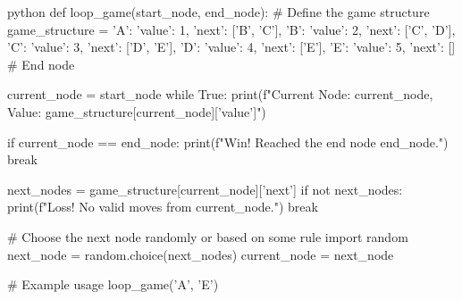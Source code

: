 python
def loop_game(start_node, end_node):
    # Define the game structure
    game_structure = {
        'A': {'value': 1, 'next': ['B', 'C']},
        'B': {'value': 2, 'next': ['C', 'D']},
        'C': {'value': 3, 'next': ['D', 'E']},
        'D': {'value': 4, 'next': ['E']},
        'E': {'value': 5, 'next': []}  # End node
    }
    
    current_node = start_node
    while True:
        print(f"Current Node: {current_node}, Value: {game_structure[current_node]['value']}")
        
        if current_node == end_node:
            print(f"Win! Reached the end node {end_node}.")
            break
        
        next_nodes = game_structure[current_node]['next']
        if not next_nodes:
            print(f"Loss! No valid moves from {current_node}.")
            break
        
        # Choose the next node randomly or based on some rule
        import random
        next_node = random.choice(next_nodes)
        current_node = next_node

# Example usage
loop_game('A', 'E')